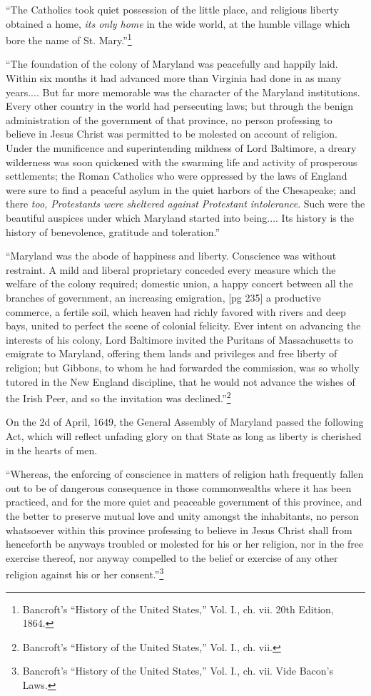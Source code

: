 “The Catholics took quiet possession of the
little place, and religious liberty obtained a home,
\emph{its only home} in the wide world, at the humble
village which bore the name of St. Mary.”\footnote{Bancroft's
“History of the United States,” Vol. I., ch. vii.
20th Edition, 1864.}

“The foundation of the colony of Maryland
was peacefully and happily laid. Within six
months it had advanced more than Virginia had
done in as many years.... But far more memorable
was the character of the Maryland institutions.
Every other country in the world had persecuting
laws; but through the benign administration
of the government of that province, no person
professing to believe in Jesus Christ was permitted
to be molested on account of religion. Under the
munificence and superintending mildness of Lord
Baltimore, a dreary wilderness was soon quickened
with the swarming life and activity of prosperous
settlements; the Roman Catholics who were oppressed
by the laws of England were sure to find
a peaceful asylum in the quiet harbors of the
Chesapeake; and there \emph{too, Protestants were
sheltered against Protestant intolerance}. Such
were the beautiful auspices under which Maryland
started into being.... Its history is the history
of benevolence, gratitude and toleration.”

“Maryland was the abode of happiness and
liberty. Conscience was without restraint. A
mild and liberal proprietary conceded every
measure which the welfare of the colony required;
domestic union, a happy concert between all the
branches of government, an increasing emigration,
[pg 235]
a productive commerce, a fertile soil, which heaven
had richly favored with rivers and deep bays,
united to perfect the scene of colonial felicity.
Ever intent on advancing the interests of his
colony, Lord Baltimore invited the Puritans of
Massachusetts to emigrate to Maryland, offering
them lands and privileges and free liberty of religion;
but Gibbons, to whom he had forwarded the
commission, was so wholly tutored in the New
England discipline, that he would not advance the
wishes of the Irish Peer, and so the invitation was
declined.”\footnote{Bancroft's “History
of the United States,” Vol. I., ch. vii.}

On the 2d of April, 1649, the General Assembly
of Maryland passed the following Act, which will
reflect unfading glory on that State as long as
liberty is cherished in the hearts of men.

“Whereas, the enforcing of conscience in matters
of religion hath frequently fallen out to be of
dangerous consequence in those commonwealths
where it has been practiced, and for the more quiet
and peaceable government of this province, and the
better to preserve mutual love and unity amongst
the inhabitants, no person whatsoever within this
province professing to believe in Jesus Christ shall
from henceforth be anyways troubled or molested
for his or her religion, nor in the free exercise
thereof, nor anyway compelled to the belief or exercise
of any other religion against his or her consent.”\footnote{Bancroft's
“History of the United States,” Vol. I., ch. vii.
Vide Bacon's Laws.}

